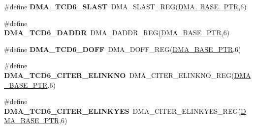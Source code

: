 \begin{DoxyCompactItemize}
\item 
\hypertarget{group___d_m_a___register___accessor___macros_ga672ec28af0a73ea4d68fd67e1c00c2cf}{}\#define {\bfseries D\+M\+A\+\_\+\+T\+C\+D6\+\_\+\+S\+L\+A\+S\+T}~D\+M\+A\+\_\+\+S\+L\+A\+S\+T\+\_\+\+R\+E\+G(\hyperlink{group___d_m_a___peripheral_ga6997fbc1b1973e9f27170217a3bd6f22}{D\+M\+A\+\_\+\+B\+A\+S\+E\+\_\+\+P\+T\+R},6)\label{group___d_m_a___register___accessor___macros_ga672ec28af0a73ea4d68fd67e1c00c2cf}

\item 
\hypertarget{group___d_m_a___register___accessor___macros_ga48867e3ab689be488624b105f0096275}{}\#define {\bfseries D\+M\+A\+\_\+\+T\+C\+D6\+\_\+\+D\+A\+D\+D\+R}~D\+M\+A\+\_\+\+D\+A\+D\+D\+R\+\_\+\+R\+E\+G(\hyperlink{group___d_m_a___peripheral_ga6997fbc1b1973e9f27170217a3bd6f22}{D\+M\+A\+\_\+\+B\+A\+S\+E\+\_\+\+P\+T\+R},6)\label{group___d_m_a___register___accessor___macros_ga48867e3ab689be488624b105f0096275}

\item 
\hypertarget{group___d_m_a___register___accessor___macros_ga4e5f76022fb322b6ad46f22afc87d44c}{}\#define {\bfseries D\+M\+A\+\_\+\+T\+C\+D6\+\_\+\+D\+O\+F\+F}~D\+M\+A\+\_\+\+D\+O\+F\+F\+\_\+\+R\+E\+G(\hyperlink{group___d_m_a___peripheral_ga6997fbc1b1973e9f27170217a3bd6f22}{D\+M\+A\+\_\+\+B\+A\+S\+E\+\_\+\+P\+T\+R},6)\label{group___d_m_a___register___accessor___macros_ga4e5f76022fb322b6ad46f22afc87d44c}

\item 
\hypertarget{group___d_m_a___register___accessor___macros_gae0ec616b075a507b1d33d7783bd9e5a1}{}\#define {\bfseries D\+M\+A\+\_\+\+T\+C\+D6\+\_\+\+C\+I\+T\+E\+R\+\_\+\+E\+L\+I\+N\+K\+N\+O}~D\+M\+A\+\_\+\+C\+I\+T\+E\+R\+\_\+\+E\+L\+I\+N\+K\+N\+O\+\_\+\+R\+E\+G(\hyperlink{group___d_m_a___peripheral_ga6997fbc1b1973e9f27170217a3bd6f22}{D\+M\+A\+\_\+\+B\+A\+S\+E\+\_\+\+P\+T\+R},6)\label{group___d_m_a___register___accessor___macros_gae0ec616b075a507b1d33d7783bd9e5a1}

\item 
\hypertarget{group___d_m_a___register___accessor___macros_ga3e433ef28a7aafd62a976c1537b586a1}{}\#define {\bfseries D\+M\+A\+\_\+\+T\+C\+D6\+\_\+\+C\+I\+T\+E\+R\+\_\+\+E\+L\+I\+N\+K\+Y\+E\+S}~D\+M\+A\+\_\+\+C\+I\+T\+E\+R\+\_\+\+E\+L\+I\+N\+K\+Y\+E\+S\+\_\+\+R\+E\+G(\hyperlink{group___d_m_a___peripheral_ga6997fbc1b1973e9f27170217a3bd6f22}{D\+M\+A\+\_\+\+B\+A\+S\+E\+\_\+\+P\+T\+R},6)\label{group___d_m_a___register___accessor___macros_ga3e433ef28a7aafd62a976c1537b586a1}


\end{DoxyCompactItemize}
